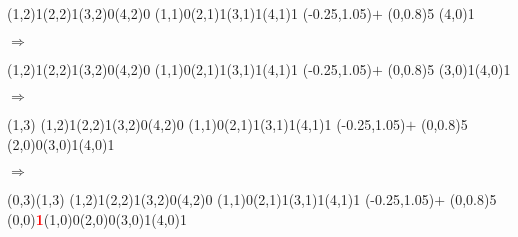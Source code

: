 \documentclass[11pt,a4paper]{article}
\begin{document}
\begin{center}
\begin{table}[ht!]
\begin{minipage}{0.15\textwidth}
\par\vspace{3\oplineheight}
\oplput(1,2){1}\oplput(2,2){1}\oplput(3,2){0}\oplput(4,2){0}
\oplput(1,1){0}\oplput(2,1){1}\oplput(3,1){1}\oplput(4,1){1}
\oplput(-0.25,1.05){$+$}
\ophline(0,0.8){5}
\oplput(4,0){1}

  \end{minipage}
  \hfillx
  \begin{minipage}{0.1\textwidth}

\phantom{ } $ \Rightarrow $

  \end{minipage}
  \hfillx
  \begin{minipage}{0.15\textwidth}

\par\vspace{3\oplineheight}
\oplput(1,2){1}\oplput(2,2){1}\oplput(3,2){0}\oplput(4,2){0}
\oplput(1,1){0}\oplput(2,1){1}\oplput(3,1){1}\oplput(4,1){1}
\oplput(-0.25,1.05){$+$}
\ophline(0,0.8){5}
\oplput(3,0){1}\oplput(4,0){1}

  \end{minipage}
  \hfillx
  \begin{minipage}{0.1\textwidth}

\phantom{ } $ \Rightarrow $

  \end{minipage}
  \hfillx
  \begin{minipage}{0.15\textwidth}

\par\vspace{3\oplineheight}
\oplput(1,3){\tiny {}}
\oplput(1,2){1}\oplput(2,2){1}\oplput(3,2){0}\oplput(4,2){0}
\oplput(1,1){0}\oplput(2,1){1}\oplput(3,1){1}\oplput(4,1){1}
\oplput(-0.25,1.05){$+$}
\ophline(0,0.8){5}
\oplput(2,0){0}\oplput(3,0){1}\oplput(4,0){1}

  \end{minipage}
  \hfillx
  \begin{minipage}{0.1\textwidth}

$ \Rightarrow $

  \end{minipage}
  \hfillx
  \begin{minipage}{0.15\textwidth}

\par\vspace{3\oplineheight}
\oplput(0,3){\tiny \textcolor{red}{}}\oplput(1,3){\tiny {}}
\oplput(1,2){1}\oplput(2,2){1}\oplput(3,2){0}\oplput(4,2){0}
\oplput(1,1){0}\oplput(2,1){1}\oplput(3,1){1}\oplput(4,1){1}
\oplput(-0.25,1.05){$+$}
\ophline(0,0.8){5}
\oplput(0,0){\textcolor{red}{\textbf{1}}}\oplput(1,0){0}\oplput(2,0){0}\oplput(3,0){1}\oplput(4,0){1}

  \end{minipage}
\end{table}

\end{center}
\end{document}
